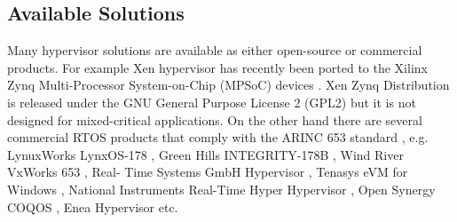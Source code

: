 
\subsection{Available Solutions}
Many hypervisor solutions are available as either open-source or commercial products. For example Xen hypervisor has recently been ported to the Xilinx Zynq Multi-Processor System-on-Chip (MPSoC) devices \cite{xenZynq}. Xen Zynq Distribution is released under the GNU General Purpose License 2 (GPL2) but it is not designed for mixed-critical applications. On the other hand there are several commercial RTOS products that comply with the ARINC 653 standard \cite{embeddedvmstate}, e.g. LynuxWorks LynxOS-178 \cite{LynxOS}, Green Hills INTEGRITY-178B \cite{INTEGRITY178B}, Wind River VxWorks 653 \cite{VxWorks}, Real- Time Systems GmbH Hypervisor \cite{RTGmbH}, Tenasys eVM for Windows \cite{eVM}, National Instruments Real-Time Hyper Hypervisor \cite{NIHypervisor}, Open Synergy COQOS \cite{COQOS}, Enea Hypervisor \cite{EneaHypervisor} etc. 

